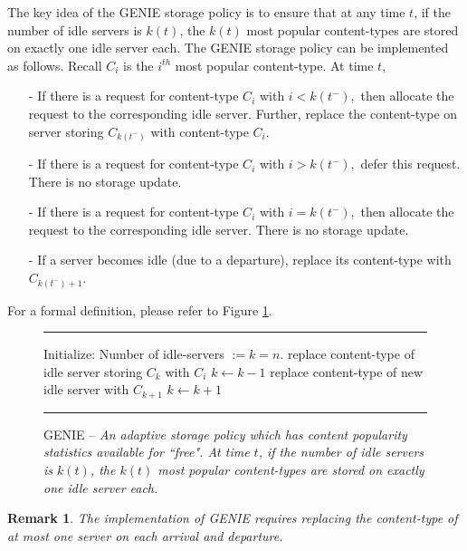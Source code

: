 \documentclass[10pt, conference, letterpaper]{IEEEtran}
\newtheorem{remark}{Remark}
\def \idle {k}
\begin{document}
The key idea of the GENIE storage policy is to ensure that at any time
$t$, if the number of idle servers is $\idle (t)$, the $\idle (t)$
most popular content-types are stored on exactly one idle server
each. The GENIE storage policy can be implemented as follows. Recall
$C_i$ is the $i^{th}$ most popular content-type. At time $t$,
\begin{itemize}
	\item[-] If there is a request for content-type $C_i$ with $i <
	k(t^-),$ then allocate the request to the corresponding idle
	server. Further, replace the content-type on server storing
	$C_{k(t^-)}$ with content-type $C_i.$
	
	\item[-] If there is a request for content-type $C_i$ with $i >
	k(t^-),$ defer this request. There is no storage update.
	
	\item[-] If there is a request for content-type $C_i$ with $i =
	k(t^-),$ then allocate the request to the corresponding idle
	server. There is no storage update.
	
	\item[-] If a server becomes idle (due to a departure), replace its
	content-type with $C_{\idle (t^-)+1}$.
\end{itemize}

\noindent For a formal definition, please refer to Figure
\ref{policy:GENIE}. \\

\begin{figure}[h]
	\hrule
	\vspace{0.1in}
	\begin{algorithmic}[1]
		\STATE Initialize: Number of idle-servers $:= \idle = n$.
		\IF {$i \neq \idle$,}
		\STATE replace content-type of idle server storing $C_\idle$ with $C_i$
		\ENDIF
		\STATE $\idle \gets \idle-1$
		\ENDIF
		\STATE replace content-type of new idle server with $C_{\idle+1}$
		\STATE $\idle \gets \idle +1$
		\ENDIF
		\ENDWHILE
	\end{algorithmic}
	\vspace{0.1in}
	\hrule
	\caption{GENIE -- \sl An adaptive storage policy which has content popularity statistics available for ``free". At time $t$, if the number of idle servers is $\idle(t)$, the $\idle(t)$ most popular content-types are stored on exactly one idle server each.}
	\label{policy:GENIE}
\end{figure}
\begin{remark} The implementation of GENIE requires replacing the
	content-type of at most one server on each arrival and departure.
\end{remark}
\end{document}
